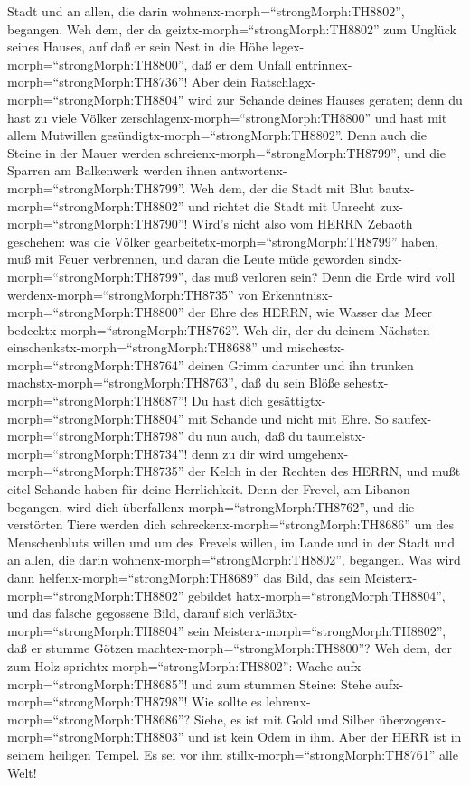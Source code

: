 Stadt und an allen, die darin wohnenx-morph=``strongMorph:TH8802'',
begangen.  Weh dem, der da
geiztx-morph=``strongMorph:TH8802'' zum Unglück seines Hauses, auf daß
er sein Nest in die Höhe legex-morph=``strongMorph:TH8800'', daß er dem
Unfall entrinnex-morph=``strongMorph:TH8736''!  Aber dein
Ratschlagx-morph=``strongMorph:TH8804'' wird zur Schande deines Hauses
geraten; denn du hast zu viele Völker
zerschlagenx-morph=``strongMorph:TH8800'' und hast mit allem Mutwillen
gesündigtx-morph=``strongMorph:TH8802''.  Denn auch die
Steine in der Mauer werden schreienx-morph=``strongMorph:TH8799'', und
die Sparren am Balkenwerk werden ihnen
antwortenx-morph=``strongMorph:TH8799''.  Weh dem, der die
Stadt mit Blut bautx-morph=``strongMorph:TH8802'' und richtet die Stadt
mit Unrecht zux-morph=``strongMorph:TH8790''!  Wird's nicht
also vom HERRN Zebaoth geschehen: was die Völker
gearbeitetx-morph=``strongMorph:TH8799'' haben, muß mit Feuer
verbrennen, und daran die Leute müde geworden
sindx-morph=``strongMorph:TH8799'', das muß verloren sein? 
Denn die Erde wird voll werdenx-morph=``strongMorph:TH8735'' von
Erkenntnisx-morph=``strongMorph:TH8800'' der Ehre des HERRN, wie Wasser
das Meer bedecktx-morph=``strongMorph:TH8762''.  Weh dir,
der du deinem Nächsten einschenkstx-morph=``strongMorph:TH8688'' und
mischestx-morph=``strongMorph:TH8764'' deinen Grimm darunter und ihn
trunken machstx-morph=``strongMorph:TH8763'', daß du sein Blöße
sehestx-morph=``strongMorph:TH8687''!  Du hast dich
gesättigtx-morph=``strongMorph:TH8804'' mit Schande und nicht mit Ehre.
So saufex-morph=``strongMorph:TH8798'' du nun auch, daß du
taumelstx-morph=``strongMorph:TH8734''! denn zu dir wird
umgehenx-morph=``strongMorph:TH8735'' der Kelch in der Rechten des
HERRN, und mußt eitel Schande haben für deine Herrlichkeit.
 Denn der Frevel, am Libanon begangen, wird dich
überfallenx-morph=``strongMorph:TH8762'', und die verstörten Tiere
werden dich schreckenx-morph=``strongMorph:TH8686'' um des Menschenbluts
willen und um des Frevels willen, im Lande und in der Stadt und an
allen, die darin wohnenx-morph=``strongMorph:TH8802'', begangen.
 Was wird dann helfenx-morph=``strongMorph:TH8689'' das
Bild, das sein Meisterx-morph=``strongMorph:TH8802'' gebildet
hatx-morph=``strongMorph:TH8804'', und das falsche gegossene Bild,
darauf sich verläßtx-morph=``strongMorph:TH8804'' sein
Meisterx-morph=``strongMorph:TH8802'', daß er stumme Götzen
machtex-morph=``strongMorph:TH8800''?  Weh dem, der zum
Holz sprichtx-morph=``strongMorph:TH8802'': Wache
aufx-morph=``strongMorph:TH8685''! und zum stummen Steine: Stehe
aufx-morph=``strongMorph:TH8798''! Wie sollte es
lehrenx-morph=``strongMorph:TH8686''? Siehe, es ist mit Gold und Silber
überzogenx-morph=``strongMorph:TH8803'' und ist kein Odem in ihm.
 Aber der HERR ist in seinem heiligen Tempel. Es sei vor
ihm stillx-morph=``strongMorph:TH8761'' alle Welt!

